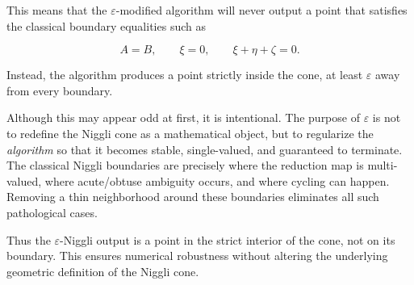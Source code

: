 \documentclass[12pt]{article}
\begin{document}
	This means that the $\varepsilon$-modified algorithm will never output a point that satisfies the classical boundary equalities such as
	
	
	\[
	A = B,\qquad \xi = 0,\qquad \xi + \eta + \zeta = 0.
	\]
	
	
	Instead, the algorithm produces a point strictly inside the cone, at least $\varepsilon$ away from every boundary.
	
	Although this may appear odd at first, it is intentional. The purpose of $\varepsilon$ is not to redefine the Niggli cone as a mathematical object, but to regularize the \emph{algorithm} so that it becomes stable, single-valued, and guaranteed to terminate. The classical Niggli boundaries are precisely where the reduction map is multi-valued, where acute/obtuse ambiguity occurs, and where cycling can happen. Removing a thin neighborhood around these boundaries eliminates all such pathological cases.
	
	Thus the $\varepsilon$-Niggli output is a point in the strict interior of the cone, not on its boundary. This ensures numerical robustness without altering the underlying geometric definition of the Niggli cone.
	
\end{document}
